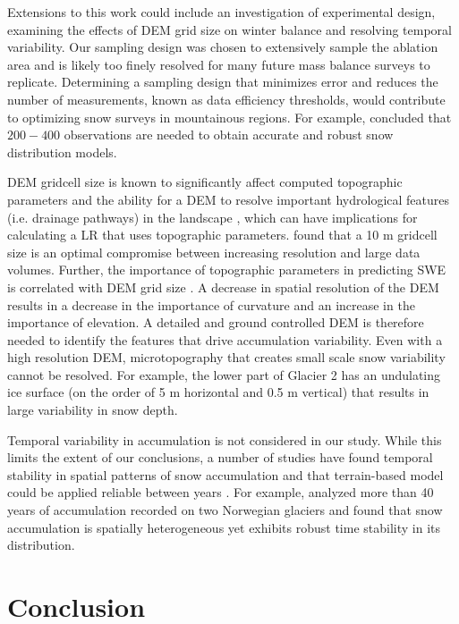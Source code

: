 \documentclass[twocolumn, letterpaper]{igs}
\begin{document}
Extensions to this work could include an investigation of experimental design, examining the effects of DEM grid size on winter balance and resolving temporal variability. Our sampling design was chosen to extensively sample the ablation area and is likely too finely resolved for many future mass balance surveys to replicate. Determining a sampling design that minimizes error and reduces the number of measurements, known as data efficiency thresholds, would contribute to optimizing snow surveys in mountainous regions. For example, \cite{Lopez2010} concluded that $200-400$ observations are needed to obtain accurate and robust snow distribution models. 

DEM gridcell size is known to significantly affect computed topographic parameters and the ability for a DEM to resolve important hydrological features (i.e. drainage pathways) in the landscape \citep{Zhang1994, Garbrecht1994, Guo-an2001, Lopez2010}, which can have implications for calculating a LR that uses topographic parameters.  \cite{Zhang1994} found that a 10 m gridcell size is an optimal compromise between increasing resolution and large data volumes. Further, the importance of topographic parameters in predicting SWE is correlated with DEM grid size \citep[e.g.][]{Kienzle2004, Lopez2010}. A decrease in spatial resolution of the DEM results in a decrease in the importance of curvature and an increase in the importance of elevation. A detailed and ground controlled DEM is therefore needed to identify the features that drive accumulation variability. Even with a high resolution DEM, microtopography that creates small scale snow variability cannot be resolved. For example, the lower part of Glacier 2 has an undulating ice surface (on the order of 5 m horizontal and 0.5 m vertical) that results in large variability in snow depth.

Temporal variability in accumulation is not considered in our study. While this limits the extent of our conclusions, a number of studies have found temporal stability in spatial patterns of snow accumulation and that terrain-based model could be applied reliable between years \citep[e.g.][]{Grunewald2013}. For example, \cite{Walmsley2015} analyzed more than 40 years of accumulation recorded on two Norwegian glaciers and found that snow accumulation is spatially heterogeneous yet exhibits robust time stability in its distribution. 

\section{Conclusion}
\end{document}
